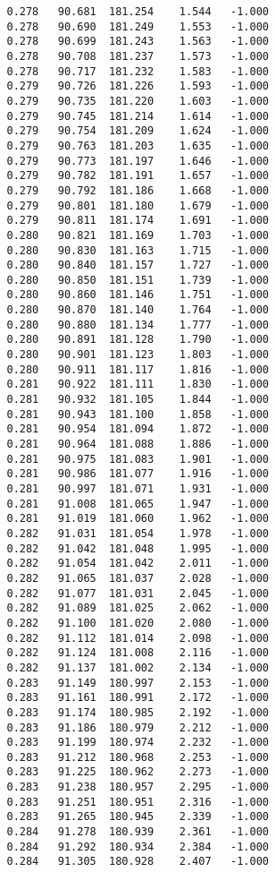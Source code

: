 \begin{verbatim}
   0.278   90.681  181.254    1.544   -1.000
   0.278   90.690  181.249    1.553   -1.000
   0.278   90.699  181.243    1.563   -1.000
   0.278   90.708  181.237    1.573   -1.000
   0.278   90.717  181.232    1.583   -1.000
   0.279   90.726  181.226    1.593   -1.000
   0.279   90.735  181.220    1.603   -1.000
   0.279   90.745  181.214    1.614   -1.000
   0.279   90.754  181.209    1.624   -1.000
   0.279   90.763  181.203    1.635   -1.000
   0.279   90.773  181.197    1.646   -1.000
   0.279   90.782  181.191    1.657   -1.000
   0.279   90.792  181.186    1.668   -1.000
   0.279   90.801  181.180    1.679   -1.000
   0.279   90.811  181.174    1.691   -1.000
   0.280   90.821  181.169    1.703   -1.000
   0.280   90.830  181.163    1.715   -1.000
   0.280   90.840  181.157    1.727   -1.000
   0.280   90.850  181.151    1.739   -1.000
   0.280   90.860  181.146    1.751   -1.000
   0.280   90.870  181.140    1.764   -1.000
   0.280   90.880  181.134    1.777   -1.000
   0.280   90.891  181.128    1.790   -1.000
   0.280   90.901  181.123    1.803   -1.000
   0.280   90.911  181.117    1.816   -1.000
   0.281   90.922  181.111    1.830   -1.000
   0.281   90.932  181.105    1.844   -1.000
   0.281   90.943  181.100    1.858   -1.000
   0.281   90.954  181.094    1.872   -1.000
   0.281   90.964  181.088    1.886   -1.000
   0.281   90.975  181.083    1.901   -1.000
   0.281   90.986  181.077    1.916   -1.000
   0.281   90.997  181.071    1.931   -1.000
   0.281   91.008  181.065    1.947   -1.000
   0.281   91.019  181.060    1.962   -1.000
   0.282   91.031  181.054    1.978   -1.000
   0.282   91.042  181.048    1.995   -1.000
   0.282   91.054  181.042    2.011   -1.000
   0.282   91.065  181.037    2.028   -1.000
   0.282   91.077  181.031    2.045   -1.000
   0.282   91.089  181.025    2.062   -1.000
   0.282   91.100  181.020    2.080   -1.000
   0.282   91.112  181.014    2.098   -1.000
   0.282   91.124  181.008    2.116   -1.000
   0.282   91.137  181.002    2.134   -1.000
   0.283   91.149  180.997    2.153   -1.000
   0.283   91.161  180.991    2.172   -1.000
   0.283   91.174  180.985    2.192   -1.000
   0.283   91.186  180.979    2.212   -1.000
   0.283   91.199  180.974    2.232   -1.000
   0.283   91.212  180.968    2.253   -1.000
   0.283   91.225  180.962    2.273   -1.000
   0.283   91.238  180.957    2.295   -1.000
   0.283   91.251  180.951    2.316   -1.000
   0.283   91.265  180.945    2.339   -1.000
   0.284   91.278  180.939    2.361   -1.000
   0.284   91.292  180.934    2.384   -1.000
   0.284   91.305  180.928    2.407   -1.000

\end{verbatim}

